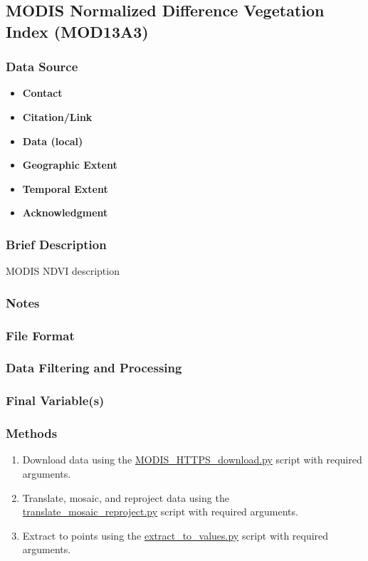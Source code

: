 \subsection{MODIS Normalized Difference Vegetation Index (MOD13A3)}
\subsubsection*{Data Source}
\begin{itemize}[nolistsep]
\item \textbf{Contact}
\item \textbf{Citation/Link}
\item \textbf{Data (local)}
\item \textbf{Geographic Extent}
\item \textbf{Temporal Extent}
\item \textbf{Acknowledgment}
\end{itemize}
\subsubsection*{Brief Description}

MODIS NDVI description

\subsubsection*{Notes}
\subsubsection*{File Format}
\subsubsection*{Data Filtering and Processing}
\subsubsection*{Final Variable(s)}
\subsubsection*{Methods}
\begin{enumerate}
\item Download data using the \href{https://github.com/earthlab/estimate-pm25/blob/master/download-earth-observations/MODIS\_HTTPS\_download.py}{MODIS\_HTTPS\_download.py} script with required arguments.
\item Translate, mosaic, and reproject data using the \href{https://github.com/earthlab/estimate-pm25/blob/master/download-earth-observations/MODIS_NDVI/translate\_mosaic\_reproject.py}{translate\_mosaic\_reproject.py} script with required arguments.
\item Extract to points using the \href{https://github.com/earthlab/estimate-pm25/blob/master/download-earth-observations/MODIS\_NDVI/extract\_to\_values.py}{extract\_to\_values.py} script with required arguments.
\end{enumerate}
